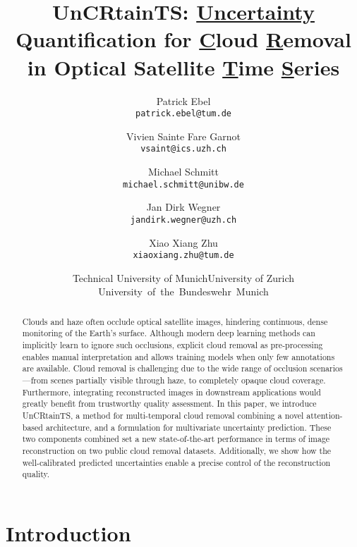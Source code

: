 \documentclass[10pt,twocolumn,letterpaper]{article}
\begin{document}
\title{UnCRtainTS: \underline{Uncertainty} Quantification for \underline{C}loud \underline{R}emoval \\ in Optical Satellite \underline{T}ime \underline{S}eries}

\author{Patrick Ebel\\
{\tt\small patrick.ebel@tum.de}
\and
Vivien Sainte Fare Garnot\\
{\tt\small vsaint@ics.uzh.ch}
\and
Michael Schmitt\\
{\tt\small michael.schmitt@unibw.de}
\and
Jan Dirk Wegner\\
{\tt\small jandirk.wegner@uzh.ch}
\and
Xiao Xiang Zhu\\
{\tt\small xiaoxiang.zhu@tum.de}
\and
{\small  Technical University of Munich\quad  University of Zurich \quad   University~of~the~Bundeswehr~Munich
}
}


\maketitle



\begin{abstract}
Clouds and haze often occlude optical satellite images, hindering continuous, dense monitoring of the Earth's surface. Although modern deep learning methods can implicitly learn to ignore such occlusions, explicit cloud removal as pre-processing enables manual interpretation and allows training models when only few annotations are available.
Cloud removal is challenging due to the wide range of occlusion scenarios---from scenes partially visible through haze, to completely opaque cloud coverage. Furthermore, integrating reconstructed images in downstream applications would greatly benefit from trustworthy quality assessment. 
In this paper, we introduce UnCRtainTS, a method for multi-temporal cloud removal combining a novel attention-based architecture, and a formulation for multivariate uncertainty prediction. These two components combined set a new state-of-the-art performance in terms of image reconstruction on two public cloud removal datasets. Additionally, we show how the well-calibrated predicted uncertainties enable a precise control of the reconstruction quality.
\end{abstract}








\section{Introduction}
\end{document}
